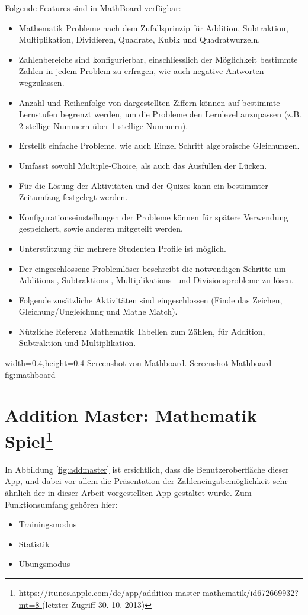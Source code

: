 Folgende Features sind in MathBoard verfügbar:

\begin{itemize}
	\item Mathematik Probleme nach dem Zufallsprinzip für Addition, Subtraktion, Multiplikation, Dividieren, Quadrate, Kubik und Quadratwurzeln.
	\item Zahlenbereiche sind konfigurierbar, einschliesslich der Möglichkeit bestimmte Zahlen in jedem Problem zu erfragen, wie auch negative Antworten wegzulassen.
	\item Anzahl und Reihenfolge von dargestellten Ziffern können auf bestimmte Lernstufen begrenzt werden, um die Probleme den Lernlevel anzupassen (z.B. 2-stellige Nummern über 1-stellige Nummern).
	\item Erstellt einfache Probleme, wie auch Einzel Schritt algebraische Gleichungen.
	\item Umfasst sowohl Multiple-Choice, als auch das Ausfüllen der Lücken.
	\item Für die Lösung der Aktivitäten und der Quizes kann ein bestimmter Zeitumfang festgelegt werden.
	\item Konfigurationseinstellungen der Probleme können für spätere Verwendung gespeichert, sowie anderen mitgeteilt werden.
	\item Unterstützung für mehrere Studenten Profile ist möglich. 
	\item Der eingeschlossene Problemlöser beschreibt die notwendigen Schritte um Additions-, Subtraktions-, Multiplikations- und Divisionsprobleme zu lösen.
	\item Folgende zusätzliche Aktivitäten sind eingeschlossen (Finde das Zeichen, Gleichung/Ungleichung und Mathe Match).
	\item Nützliche Referenz Mathematik Tabellen zum Zählen, für Addition, Subtraktion und Multiplikation.
\end{itemize}

  {width=0.4\textwidth,height=0.4\textheight}%
  {Screenshot von Mathboard.}%
  {Screenshot Mathboard}%
  {fig:mathboard}%

\section[Addition Master: Mathematik Spiel]{Addition Master: Mathematik Spiel\footnote{\url{https://itunes.apple.com/de/app/addition-master-mathematik/id672669932?mt=8 } (letzter Zugriff 30. 10. 2013)}}
In Abbildung \ref{fig:addmaster} ist ersichtlich, dass die Benutzeroberfläche dieser App, 
und dabei vor allem die Präsentation der Zahleneingabemöglichkeit sehr ähnlich der in dieser Arbeit 
vorgestellten App gestaltet wurde. Zum Funktionsumfang gehören hier: 
\begin{itemize}
	\item Trainingsmodus
	\item Statistik
	\item Übungsmodus
\end{itemize}

